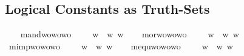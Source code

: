 \begin{isabellebody}
\subsection{Logical Constants as Truth-Sets}
\isamarkuptrue%
%
\begin{isamarkuptext}%
%
\end{isamarkuptext}\isamarkuptrue%
\ \ \isamarkupfalse%
\ mand{\isacharcolon}{\isacharcolon}{\isachardoublequoteopen}wo{\isasymRightarrow}wo{\isasymRightarrow}wo{\isachardoublequoteclose}\ {\isacharparenleft}\isactrlbold {\isasymand}{\isachardoublequoteclose}{\isacharparenright}\ \ {\isachardoublequoteopen}{\isasymphi}\isactrlbold {\isasymand}{\isasympsi}\ {\isasymequiv}\ {\isasymlambda}w{\isachardot}\ {\isacharparenleft}{\isasymphi}\ w{\isacharparenright}{\isasymand}{\isacharparenleft}{\isasympsi}\ w{\isacharparenright}{\isachardoublequoteclose}\isanewline
\ \ \isamarkupfalse%
\ mor{\isacharcolon}{\isacharcolon}{\isachardoublequoteopen}wo{\isasymRightarrow}wo{\isasymRightarrow}wo{\isachardoublequoteclose}\ {\isacharparenleft}\isactrlbold {\isasymor}{\isachardoublequoteclose}{\isacharparenright}\ \ {\isachardoublequoteopen}{\isasymphi}\isactrlbold {\isasymor}{\isasympsi}\ {\isasymequiv}\ {\isasymlambda}w{\isachardot}\ {\isacharparenleft}{\isasymphi}\ w{\isacharparenright}{\isasymor}{\isacharparenleft}{\isasympsi}\ w{\isacharparenright}{\isachardoublequoteclose}\isanewline
\ \ \isamarkupfalse%
\ mimp{\isacharcolon}{\isacharcolon}{\isachardoublequoteopen}wo{\isasymRightarrow}wo{\isasymRightarrow}wo{\isachardoublequoteclose}\ {\isacharparenleft}\isactrlbold {\isasymrightarrow}{\isachardoublequoteclose}{\isacharparenright}\ \ {\isachardoublequoteopen}{\isasymphi}\isactrlbold {\isasymrightarrow}{\isasympsi}\ {\isasymequiv}\ {\isasymlambda}w{\isachardot}\ {\isacharparenleft}{\isasymphi}\ w{\isacharparenright}{\isasymlongrightarrow}{\isacharparenleft}{\isasympsi}\ w{\isacharparenright}{\isachardoublequoteclose}\isanewline
\ \ \isamarkupfalse%
\ mequ{\isacharcolon}{\isacharcolon}{\isachardoublequoteopen}wo{\isasymRightarrow}wo{\isasymRightarrow}wo{\isachardoublequoteclose}\ {\isacharparenleft}\isactrlbold {\isasymleftrightarrow}{\isachardoublequoteclose}{\isacharparenright}\ \ {\isachardoublequoteopen}{\isasymphi}\isactrlbold {\isasymleftrightarrow}{\isasympsi}\ {\isasymequiv}\ {\isasymlambda}w{\isachardot}\ {\isacharparenleft}{\isasymphi}\ w{\isacharparenright}{\isasymlongleftrightarrow}{\isacharparenleft}{\isasympsi}\ w{\isacharparenright}{\isachardoublequoteclose}\isanewline

\end{isabellebody}
